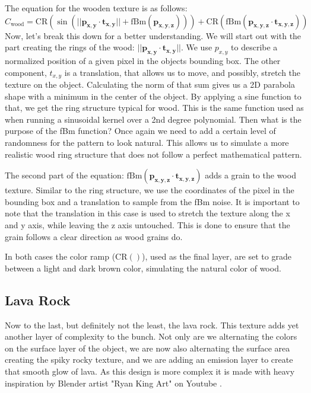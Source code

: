 \documentclass[a4paper, 12pt]{olplainarticle}
\begin{document}
The equation for the wooden texture is as follows:
$$
    C_{\text{wood}} = 
    \text{CR}(\sin(||\mathbf{p_{x,y}} \cdot \mathbf{t_{x,y}}|| + \text{fBm}(\mathbf{p_{x,y,z}}))) + 
    \text{CR}(\text{fBm}(\mathbf{p_{x,y,z}} \cdot \mathbf{t_{x,y,z}})) 
$$
Now, let's break this down for a better understanding. We will start out with the part creating the rings of the wood:
$||\mathbf{p_{x,y}} \cdot \mathbf{t_{x,y}}||$. We use $p_{x,y}$ to describe a normalized position of a given pixel in the objects bounding box.
The other component, $t_{x,y}$ is a translation, that allows us to move, and possibly, stretch the texture on the object. 
Calculating the norm of that sum gives us a 2D parabola shape with a minimum in the center of the object.
By applying a sine function to that, we get the ring structure typical for wood. This is the same function used as when running a sinusoidal kernel over a 2nd degree polynomial. 
Then what is the purpose of the fBm function? Once again we need to add a certain level of randomness for the pattern to look natural. 
This allows us to simulate a more realistic wood ring structure that does not follow a perfect mathematical pattern.

The second part of the equation: $\text{fBm}(\mathbf{p_{x,y,z}} \cdot \mathbf{t_{x,y,z}})$ adds a grain to the wood texture.
Similar to the ring structure, we use the coordinates of the pixel in the bounding box and a translation to sample from the fBm noise.
It is important to note that the translation in this case is used to stretch the texture along the x and y axis, while leaving the z axis untouched.
This is done to ensure that the grain follows a clear direction as wood grains do.

In both cases the color ramp ($\text{CR}()$), used as the final layer, are set to grade between a light and dark brown color, simulating the natural color of wood.

\subsection{Lava Rock}
Now to the last, but definitely not the least, the lava rock. This texture adds yet another layer of complexity to the bunch.
Not only are we alternating the colors on the surface layer of the object, we are now also alternating the surface area creating the spiky rocky texture, and we are adding an emission layer to create that smooth glow of lava.
As this design is more complex it is made with heavy inspiration by Blender artist "Ryan King Art" on Youtube \citep{lava-tutorial}. 
\end{document}
